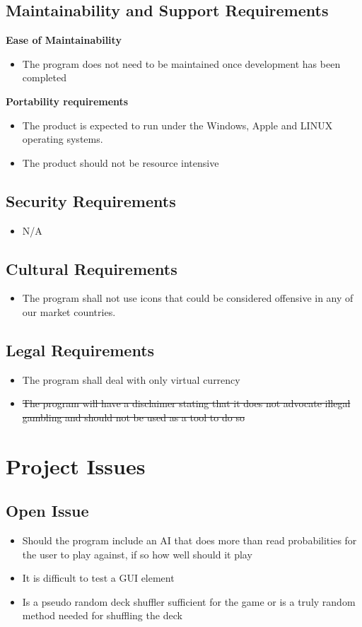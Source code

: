 \documentclass[12pt]{article}
\begin{document}
	\subsection{Maintainability and Support Requirements}
	\textbf{Ease of Maintainability}
	\begin{itemize}
	\item	The program does not need to be maintained once development has been completed
	\end{itemize}
	\textbf{Portability requirements}
	\begin{itemize}
	\item	The product is expected to run under the Windows, Apple and LINUX operating 				systems.
	\item 	The product should not be resource intensive
	\end{itemize}

	\subsection{Security Requirements}
	\begin{itemize}
	\item 	N/A
	\end{itemize}
	\subsection{Cultural Requirements}
	\begin{itemize}
	\item 	The program shall not use icons that could be considered offensive in any of 				our market countries.
	\end{itemize}
	\subsection{Legal Requirements}
	\begin{itemize}
	\item	The program shall deal with only virtual currency
	\item 	\sout{The program will have a disclaimer stating that it does not advocate illegal 				gambling and should not be used as a tool to do so}
	\end{itemize}
	\section{Project Issues}
	\subsection{Open Issue}
	\begin{itemize}
	\item	Should the program include an AI that does more than read probabilities for the 			user to play against, if so how well should it play
	\item	It is difficult to test a GUI element
	\item	Is a pseudo random deck shuffler sufficient for the game or is a truly random 				method needed for shuffling the deck
	\end{itemize}
\end{document}
